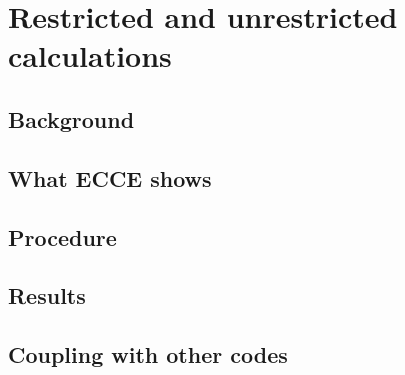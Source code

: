 \chapter{Restricted and unrestricted calculations}
\label{ch:restricted-unrestricted}


\section{Background}

\section{What ECCE shows}

\section{Procedure}

\section{Results}

\section{Coupling with other codes}

